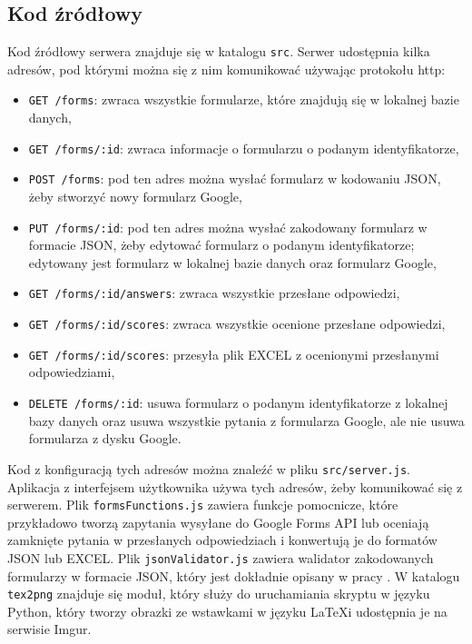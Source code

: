 \subsection{Kod źródłowy}
Kod źródłowy serwera znajduje się w katalogu \texttt{src}. Serwer udostępnia kilka adresów,
pod którymi można się z nim komunikować używając protokołu http:
\begin{itemize}
  \item \texttt{GET /forms}: zwraca wszystkie formularze, które znajdują się w lokalnej
    bazie danych,
  \item \texttt{GET /forms/:id}: zwraca informacje o formularzu o podanym identyfikatorze,
  \item \texttt{POST /forms}: pod ten adres można wysłać formularz w kodowaniu JSON, żeby
    stworzyć nowy formularz Google,
  \item \texttt{PUT /forms/:id}: pod ten adres można wysłać zakodowany formularz w formacie
    JSON, żeby edytować formularz o podanym identyfikatorze; edytowany jest formularz
    w lokalnej bazie danych oraz formularz Google,
  \item \texttt{GET /forms/:id/answers}: zwraca wszystkie przesłane odpowiedzi,
  \item \texttt{GET /forms/:id/scores}: zwraca wszystkie ocenione przesłane odpowiedzi,
  \item \texttt{GET /forms/:id/scores}: przesyła plik EXCEL z ocenionymi przesłanymi 
    odpowiedziami,
  \item \texttt{DELETE /forms/:id}: usuwa formularz o podanym identyfikatorze z lokalnej bazy
    danych oraz usuwa wszystkie pytania z formularza Google, ale nie usuwa formularza z
    dysku Google.
\end{itemize}
Kod z konfiguracją tych adresów można znaleźć w pliku \texttt{src/server.js}. Aplikacja
z interfejsem użytkownika używa tych adresów, żeby komunikować się z serwerem.
Plik \texttt{formsFunctions.js} zawiera funkcje pomocnicze, które przykładowo tworzą
zapytania wysyłane do Google Forms API lub oceniają zamknięte pytania w przesłanych
odpowiedziach i konwertują je do formatów JSON lub EXCEL. Plik \texttt{jsonValidator.js}
zawiera walidator zakodowanych formularzy w formacie JSON, który jest dokładnie opisany
w pracy \ap. W katalogu \texttt{tex2png} znajduje się moduł, który służy do uruchamiania
skryptu w języku Python, który tworzy obrazki ze wstawkami w języku \LaTeX i udostępnia
je na serwisie Imgur.

